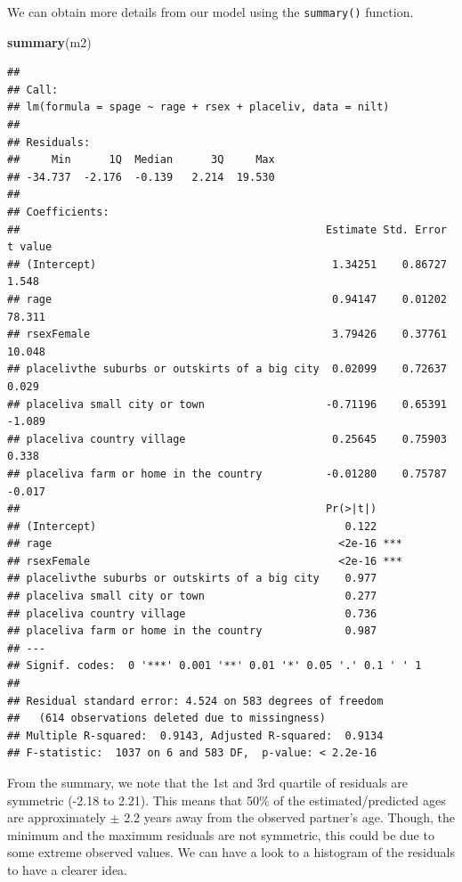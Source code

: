 \documentclass[
]{book}
\newenvironment{Shaded}{\begin{snugshade}}{\end{snugshade}}
\newcommand{\FunctionTok}[1]{\textcolor[rgb]{0.13,0.29,0.53}{\textbf{#1}}}
\newcommand{\NormalTok}[1]{#1}
\begin{document}
We can obtain more details from our model using the \texttt{summary()} function.

\begin{Shaded}
\begin{Highlighting}[]
\FunctionTok{summary}\NormalTok{(m2)}
\end{Highlighting}
\end{Shaded}

\begin{verbatim}
## 
## Call:
## lm(formula = spage ~ rage + rsex + placeliv, data = nilt)
## 
## Residuals:
##     Min      1Q  Median      3Q     Max 
## -34.737  -2.176  -0.139   2.214  19.530 
## 
## Coefficients:
##                                                Estimate Std. Error t value
## (Intercept)                                     1.34251    0.86727   1.548
## rage                                            0.94147    0.01202  78.311
## rsexFemale                                      3.79426    0.37761  10.048
## placelivthe suburbs or outskirts of a big city  0.02099    0.72637   0.029
## placeliva small city or town                   -0.71196    0.65391  -1.089
## placeliva country village                       0.25645    0.75903   0.338
## placeliva farm or home in the country          -0.01280    0.75787  -0.017
##                                                Pr(>|t|)    
## (Intercept)                                       0.122    
## rage                                             <2e-16 ***
## rsexFemale                                       <2e-16 ***
## placelivthe suburbs or outskirts of a big city    0.977    
## placeliva small city or town                      0.277    
## placeliva country village                         0.736    
## placeliva farm or home in the country             0.987    
## ---
## Signif. codes:  0 '***' 0.001 '**' 0.01 '*' 0.05 '.' 0.1 ' ' 1
## 
## Residual standard error: 4.524 on 583 degrees of freedom
##   (614 observations deleted due to missingness)
## Multiple R-squared:  0.9143, Adjusted R-squared:  0.9134 
## F-statistic:  1037 on 6 and 583 DF,  p-value: < 2.2e-16
\end{verbatim}

From the summary, we note that the 1st and 3rd quartile of residuals are symmetric (-2.18 to 2.21). This means that 50\% of the estimated/predicted ages are approximately \(\pm\) 2.2 years away from the observed partner's age. Though, the minimum and the maximum residuals are not symmetric, this could be due to some extreme observed values. We can have a look to a histogram of the residuals to have a clearer idea.
\end{document}
